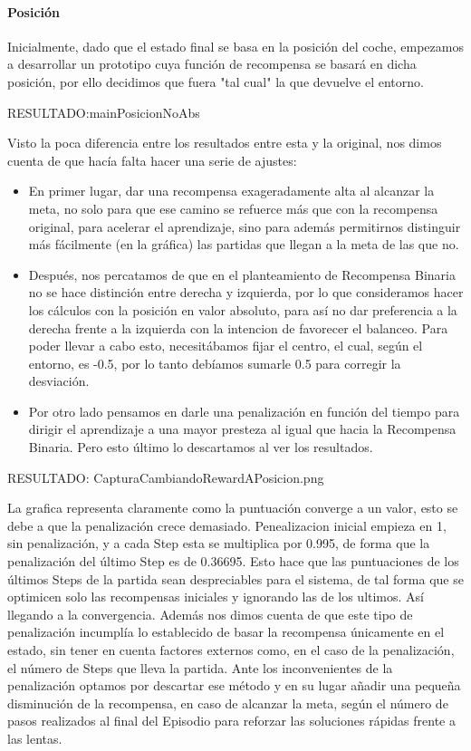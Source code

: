 \paragraph{Posición}
Inicialmente, dado que el estado final se basa en la posición del coche, empezamos a desarrollar un prototipo cuya función de recompensa se basará en dicha posición, por ello decidimos que fuera "tal cual" la que devuelve el entorno. 

 RESULTADO:mainPosicionNoAbs

Visto la poca diferencia entre los resultados entre esta y la original, nos dimos cuenta de que hacía falta hacer una serie de ajustes:

\begin{itemize}
    \item En primer lugar, dar una recompensa exageradamente alta al alcanzar la meta, no solo para que ese camino se refuerce más que con la recompensa original, para acelerar el aprendizaje, sino para además permitirnos distinguir más fácilmente (en la gráfica) las partidas que llegan a la meta de las que no.  
    \item Después, nos percatamos de que en el planteamiento de Recompensa Binaria no se hace distinción entre derecha y izquierda, por lo que consideramos hacer los cálculos con la posición en valor absoluto, para así no dar preferencia a la derecha frente a la izquierda con la intencion de favorecer el balanceo.
     Para poder llevar a cabo esto, necesitábamos fijar el centro, el cual, según el entorno, es -0.5, por lo tanto debíamos sumarle 0.5 para corregir la desviación.
    \item Por otro lado pensamos en darle una penalización en función del tiempo para dirigir el aprendizaje a una mayor presteza al igual que hacia la Recompensa Binaria. Pero esto último lo descartamos al ver los resultados.
\end{itemize}
 RESULTADO: CapturaCambiandoRewardAPosicion.png

La grafica representa claramente como la puntuación converge a un valor, esto se debe a que la penalización crece demasiado.
Penealizacion inicial empieza en 1, sin penalización, y a cada Step esta se multiplica por 0.995, de forma que la penalización del último Step es de 0.36695. Esto hace que las puntuaciones de los últimos Steps de la partida sean despreciables para el sistema, de tal forma que se optimicen solo las recompensas iniciales y ignorando las de los ultimos. Así llegando a la convergencia. 
Además nos dimos cuenta de que este tipo de penalización incumplía lo establecido de basar la recompensa únicamente en el estado, sin tener en cuenta factores externos como, en el caso de la penalización, el número de Steps que lleva la partida.
Ante los inconvenientes de la penalización optamos por descartar ese método y en su lugar añadir una pequeña disminución de la recompensa, en caso de alcanzar la meta, según el número de pasos realizados al final del Episodio para reforzar las soluciones rápidas frente a las lentas.


